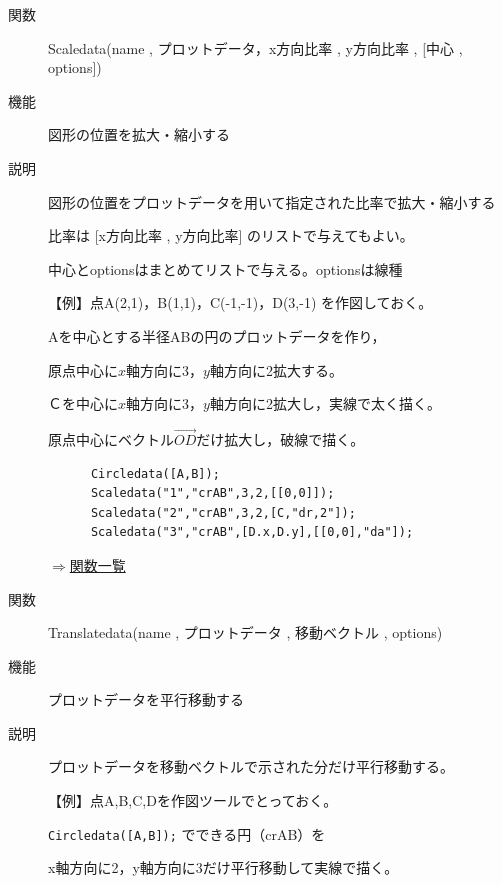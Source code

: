 \documentclass[papersize,a4paper,12pt,uplatex]{jsarticle}
\begin{document}
\begin{description}
\vspace{\baselineskip}
\hypertarget{scaledata}{}
\item[関数]  Scaledata(name , プロットデータ，x方向比率 , y方向比率 , [中心 , options])
\item[機能]  図形の位置を拡大・縮小する
\item[説明]  図形の位置をプロットデータを用いて指定された比率で拡大・縮小する

  比率は [x方向比率 , y方向比率] のリストで与えてもよい。
  
  中心とoptionsはまとめてリストで与える。optionsは線種
  
\vspace{\baselineskip}
【例】点A(2,1)，B(1,1)，C(-1,-1)，D(3,-1) を作図しておく。

 Aを中心とする半径ABの円のプロットデータを作り，
    
原点中心に$x$軸方向に3，$y$軸方向に2拡大する。

Ｃを中心に$x$軸方向に3，$y$軸方向に2拡大し，実線で太く描く。

原点中心にベクトル$\overrightarrow{OD} $だけ拡大し，破線で描く。
\begin{verbatim}
      Circledata([A,B]);
      Scaledata("1","crAB",3,2,[[0,0]]);
      Scaledata("2","crAB",3,2,[C,"dr,2"]);
      Scaledata("3","crAB",[D.x,D.y],[[0,0],"da"]);
\end{verbatim}
 \begin{center}  \end{center}

\begin{flushright}  \hyperlink{functionlist}{$\Rightarrow$関数一覧}\end{flushright}


\vspace{\baselineskip}
\hypertarget{translatedata}{}
\item[関数]  Translatedata(name , プロットデータ , 移動ベクトル , options)
\item[機能]  プロットデータを平行移動する
\item[説明]  プロットデータを移動ベクトルで示された分だけ平行移動する。

\vspace{\baselineskip}
【例】点A,B,C,Dを作図ツールでとっておく。

    \verb|Circledata([A,B]);| でできる円（crAB）を
    
 x軸方向に2，y軸方向に3だけ平行移動して実線で描く。
    

\end{description}
\end{document}

